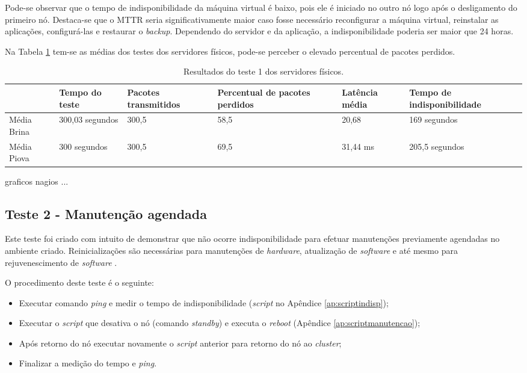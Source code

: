 Pode-se observar que o tempo de indisponibilidade da máquina virtual é baixo, pois ele é iniciado no outro nó logo após o desligamento do 
primeiro nó. Destaca-se que o \ac{MTTR} seria significativamente maior caso fosse necessário reconfigurar a máquina virtual, reinstalar as 
aplicações, configurá-las e restaurar o \textit{backup}. Dependendo do servidor e da aplicação, a indisponibilidade poderia ser maior que 24 horas.

Na Tabela \ref{tab:teste1resultados} tem-se as médias dos testes dos servidores físicos, pode-se perceber o elevado percentual de pacotes perdidos.

\begin{table}[h!]
\caption{Resultados do teste 1 dos servidores físicos.}
\label{tab:teste1resultados}
\begin{center}
\begin{tabular}{|l|p{2.3cm}|p{2.2cm}|p{2.5cm}|p{2cm}|p{2.7cm}|}\hline
 & \textbf{Tempo do teste} & \textbf{Pacotes transmitidos} & \textbf{Percentual de pacotes perdidos} & \textbf{Latência média} & \textbf{Tempo de indisponibilidade} \\\hline
Média Brina & 300,03 segundos & 300,5 & 58,5 & 20,68 & 169 segundos \\\hline
Média Piova & 300 segundos & 300,5 & 69,5 & 31,44 ms & 205,5 segundos \\\hline
\end{tabular}
\end{center}
\end{table}

graficos nagios
...

\subsection{Teste 2 - Manutenção agendada}

Este teste foi criado com intuito de demonstrar que não ocorre indisponibilidade para efetuar manutenções previamente agendadas no ambiente criado.
Reinicializações são necessárias para manutenções de \textit{hardware}, atualização de \textit{software} e até mesmo para rejuvenescimento de
\textit{software} \cite{melo2014}.

O procedimento deste teste é o seguinte:
\begin{itemize}
 \item Executar comando \textit{ping} e medir o tempo de indisponibilidade (\textit{script} no Apêndice \ref{ap:scriptindisp});
 \item Executar o \textit{script} que desativa o nó (comando \textit{standby}) e executa o \textit{reboot} (Apêndice \ref{ap:scriptmanutencao});
 \item Após retorno do nó executar novamente o \textit{script} anterior para retorno do nó ao \textit{cluster};
 \item Finalizar a medição do tempo e \textit{ping}.
\end{itemize}

